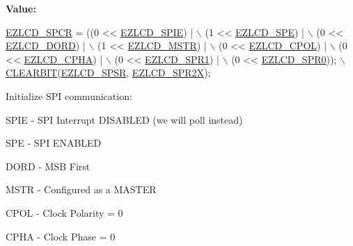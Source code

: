 {\bfseries Value\-:}
\begin{DoxyCode}
\hyperlink{group__ez_l_c_d__103__user__config_ga0205242a776d9aab15150edb665e3941}{EZLCD\_SPCR} = ((0 << \hyperlink{group__ez_l_c_d__103__user__config_gad257a8388d58c8c334fd6e6560d62af6}{EZLCD\_SPIE}) |                    \(\backslash\)
                                      (1 <<  \hyperlink{group__ez_l_c_d__103__user__config_gac51ec184538e38e946fdc90813cc58af}{EZLCD\_SPE})  |                    \(\backslash\)
                                      (0 <<  \hyperlink{group__ez_l_c_d__103__user__config_ga0001e83f90daec4f19fde73532af43d0}{EZLCD\_DORD}) |                    \(\backslash\)
                                      (1 <<  \hyperlink{group__ez_l_c_d__103__user__config_gab4f6c4fe9fb91004a29df47a5cfcb723}{EZLCD\_MSTR}) |                    \(\backslash\)
                                      (0 <<  \hyperlink{group__ez_l_c_d__103__user__config_gafae739752ee0d5822b4a3e3d48bc1a1f}{EZLCD\_CPOL}) |                    \(\backslash\)
                                      (0 <<  \hyperlink{group__ez_l_c_d__103__user__config_ga5317237df9ba416ecac5e89e5bbd4092}{EZLCD\_CPHA}) |                    \(\backslash\)
                                      (0 <<  \hyperlink{group__ez_l_c_d__103__user__config_gae9a52aea26ed6ba9564bccad0effcbae}{EZLCD\_SPR1}) |                    \(\backslash\)
                                      (0 <<  \hyperlink{group__ez_l_c_d__103__user__config_ga51b807c704bcc640ddecf99866ca4d72}{EZLCD\_SPR0}));                    
      \hyperlink{group__ez_l_c_d__103__common_ga8826ffc761710e6313c4c3e3188bfc13}{\(\backslash\)}
\hyperlink{group__ez_l_c_d__103__common_ga8826ffc761710e6313c4c3e3188bfc13}{                        CLEARBIT}(\hyperlink{group__ez_l_c_d__103__user__config_ga0a3069206c81d1a0b74d83e52b9ddfd8}{EZLCD\_SPSR}, 
      \hyperlink{group__ez_l_c_d__103__user__config_gaf31393f19135510f78c7e0a3c71b682d}{EZLCD\_SPR2X});
\end{DoxyCode}
Initialize S\-P\-I communication\-: \par
 S\-P\-I\-E -\/ S\-P\-I Interrupt D\-I\-S\-A\-B\-L\-E\-D (we will poll instead) \par
 S\-P\-E -\/ S\-P\-I E\-N\-A\-B\-L\-E\-D \par
 D\-O\-R\-D -\/ M\-S\-B First \par
 M\-S\-T\-R -\/ Configured as a M\-A\-S\-T\-E\-R \par
 C\-P\-O\-L -\/ Clock Polarity = 0 \par
 C\-P\-H\-A -\/ Clock Phase = 0 \par
